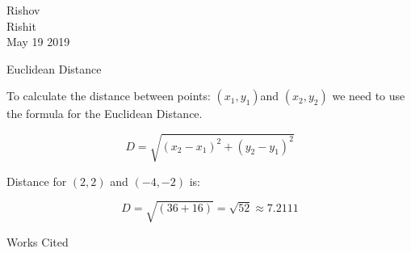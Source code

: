 \documentclass[12pt]{article}
\newenvironment{workscited}{\newpage \begin{center} Works Cited \end{center}}{\newpage }
\begin{document}
\begin{flushleft}

Rishov\\
Rishit\\
May 19 2019\\


\begin{center}
Euclidean Distance
\end{center}


\setlength{\parindent}{0.5in}
To calculate the distance between points: $ (x_1, y_1)  $and $ (x_2, y_2) $ we need to use the formula for the Euclidean Distance.

$$ D = \sqrt{(x_2 - x_1)^2 + (y_2 - y_1)^2} $$

Distance for $ (2,2) $ and $ (-4, -2) $ is:

$$ D = \sqrt{(36 + 16)} = \sqrt{52} \approx 7.2111 $$

\setlength{\parindent}{0.5in}


\begin{workscited}



\end{workscited}

\end{flushleft}
\end{document}

